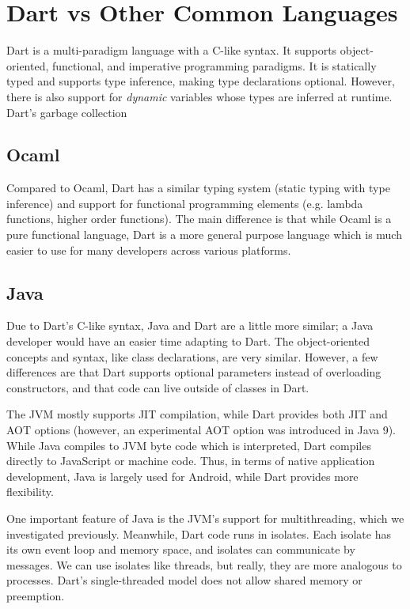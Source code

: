 \section{Dart vs Other Common Languages}
Dart is a multi-paradigm language with a C-like syntax. It supports object-oriented, functional, and imperative programming
paradigms. It is statically typed and supports type inference, making type declarations optional. However, 
there is also support for \emph{dynamic} variables whose types are inferred at runtime. Dart's garbage collection

\subsection{Ocaml}
Compared to Ocaml, Dart has a similar typing system (static typing with type inference) and support for functional programming
elements (e.g. lambda functions, higher order functions). The main difference is that while Ocaml is a pure functional language, Dart is a more
general purpose language which is much easier to use for many developers across various platforms.

\subsection{Java}
Due to Dart's C-like syntax, Java and Dart are a little more similar; a Java developer would have an easier time adapting to Dart. The object-oriented
concepts and syntax, like class declarations, are very similar. However, a few differences are that Dart supports optional parameters instead of overloading constructors, and
that code can live outside of classes in Dart.  

The JVM mostly supports JIT compilation, while Dart provides both JIT and AOT options (however, an experimental AOT option was introduced in Java 9).
While Java compiles to JVM byte code which is interpreted, Dart compiles directly to JavaScript or machine code. Thus, in terms of native 
application development, Java is largely used for Android, while Dart provides more flexibility.

One important feature of Java is the JVM's support for multithreading, which we investigated previously. Meanwhile, Dart code runs in isolates. 
Each isolate has its own event loop and memory space, and isolates can communicate by messages. We can use isolates like threads, but really, 
they are more analogous to processes. Dart's single-threaded model does not allow shared memory or preemption.

